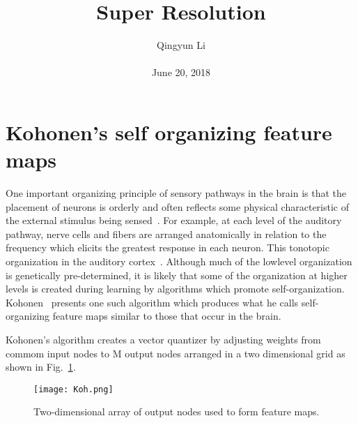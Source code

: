 \documentclass[10pt,twocolumn,letterpaper]{article}
\begin{document}
\author{Qingyun Li\\\\
June 20, 2018}        
\title{Super Resolution}

\maketitle

\section{Kohonen's self organizing feature maps}
\par One important organizing principle of sensory pathways in the brain is that the placement of neurons is orderly and often reflects some physical characteristic of the external stimulus being sensed~\cite{kandel2000principles}. For example, at each level of the auditory pathway, nerve cells and fibers are arranged anatomically in relation to the frequency which elicits the greatest response in each neuron. This tonotopic organization in the auditory cortex~\cite{kandel2000principles}. Although much of the lowlevel organization is genetically pre-determined, it is likely that some of the organization at higher levels is created during learning by algorithms which promote self-organization. Kohonen~\cite{Kohonen1984Self} presents one such algorithm which produces what he calls self-organizing feature maps similar to those that occur in the brain.
\par Kohonen's algorithm creates a vector quantizer by adjusting weights from commom input nodes to M output nodes arranged in a two dimensional grid as shown in Fig.~\ref{17}. 
\begin{figure}[htbp]
 \centering{}
\texttt{[image: Koh.png]}\\
 \caption{Two-dimensional array of output nodes used to form feature maps.}
\label{17}
\end{figure}
 
 
\end{document}
